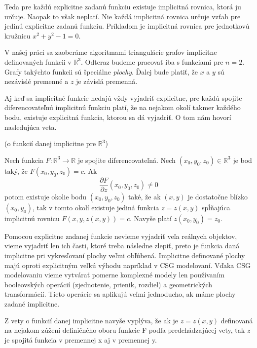 Teda pre každú explicitne zadanú funkciu existuje implicitná rovnica, ktorá ju určuje.
Naopak to však neplatí. Nie každá implicitná rovnica určuje vzťah pre jedinú explicitne zadanú
funkciu. Príkladom je implicitná rovnica pre jednotkovú kružnicu $x^2 + y^2 - 1 = 0$. 

V našej práci sa zaoberáme algoritmami triangulácie grafov implicitne definovaných funkcii v 
$\mathbb{R}^3$. Odteraz
budeme pracovať iba s funkciami pre $n = 2$. Grafy takýchto funkcii sú špeciálne \textit{plochy}. 
Ďalej bude platiť, že $x$ a $y$ sú nezávislé premenné a $z$ je závislá premenná.

Aj keď sa implicitné funkcie nedajú vždy vyjadriť explicitne, pre každú spojite diferencovateľnú
implicitnú funkciu platí, že na nejakom okolí takmer každého bodu, existuje explicitná funkcia,
ktorou sa dá vyjadriť.
O tom nám hovorí nasledujúca veta.

\begin{theorem}
 (o funkcií danej implicitne pre $\mathbb{R}^3$)
 
 Nech funkcia $F: \mathbb{R}^3 \to \mathbb{R}$ je spojite diferencovateľná. 
 Nech $(x_0, y_0, z_0) \in \mathbb{R}^3$ je bod taký, že $F(x_0, y_0, z_0) = c$.
 Ak $$\frac{\partial F}{\partial z} (x_0, y_0, z_0) \neq 0$$ potom existuje okolie 
 bodu $(x_0, y_0, z_0)$ také, že ak $(x, y)$ je dostatočne blízko $(x_0, y_0)$, 
 tak v tomto okolí existuje jediná funkcia $z = z(x ,y)$ spĺňajúca implicitnú rovnicu
 $F(x, y, z(x, y)) = c$. Navyše platí $z(x_0, y_0) = z_0$.
\end{theorem}

Pomocou explicitne zadanej funkcie nevieme vyjadriť veľa reálnych objektov, 
vieme vyjadriť len ich časti, ktoré treba následne zlepiť, 
preto je funkcia daná implicitne pri vykresľovaní plochy veľmi obľúbená. 
Implicitne definované plochy majú oproti explicitným veľkú výhodu napríklad
v CSG modelovaní. Vďaka CSG modelovaniu vieme vytvárať pomerne komplexné
modely len používaním booleovských operácií (zjednotenie, prienik, rozdiel)
a geometrických transformácií. Tieto operácie sa aplikujú veľmi jednoducho, ak
máme plochy zadané implicitne.


\begin{note}
    Z vety o funkcií danej implicitne navyše vyplýva, že ak je $z = z(x,y)$ definovaná na nejakom 
    zúžení definičného oboru funkcie F podľa predchádzajúcej vety, tak $z$ je spojitá funkcia v 
    premennej x aj v premennej y. 
\end{note}

